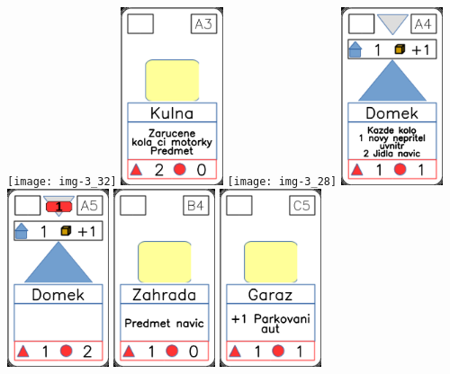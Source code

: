 \documentclass[a4paper]{article}
\begin{document}
	\texttt{[image: img-3\_32]}
	\includegraphics[width=3.0cm]{img-2_17}
	\texttt{[image: img-3\_28]}
	\includegraphics[width=3.0cm]{img-3_3}
	\includegraphics[width=3.0cm]{img-3_4}
	\includegraphics[width=3.0cm]{img-2_23}
	\includegraphics[width=3.0cm]{img-2_14}
\end{document}
